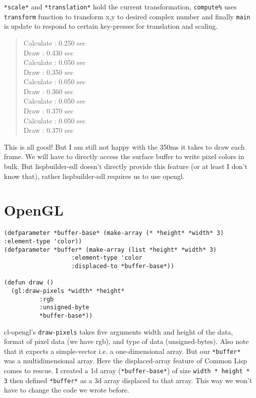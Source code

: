 \documentclass[11pt,a4paper]{article}
\begin{document}
\texttt{*scale*} and \texttt{*translation*} hold the current transformation, \texttt{compute\%} uses \texttt{transform} function to transform x,y to desired complex number and finally \texttt{main} is update to respond to certain key-presses for translation and scaling.

\begin{verse}
Calculate : 0.250 sec\\
Draw      : 0.430 sec\\
Calculate : 0.050 sec\\
Draw      : 0.350 sec\\
Calculate : 0.050 sec\\
Draw      : 0.360 sec\\
Calculate : 0.050 sec\\
Draw      : 0.370 sec\\
Calculate : 0.050 sec\\
Draw      : 0.370 sec\\
\end{verse}

This is all good! But I am still not happy with the 350ms it takes to draw each frame. 
We will have to directly access the surface buffer to write pixel colors in bulk. But lispbuilder-sdl doesn't directly provide this feature (or at least I don't know that), rather lispbuilder-sdl requires us to use opengl. 

\section{OpenGL}
\label{sec:org4f1eb20}
\begin{lstlisting}
(defparameter *buffer-base* (make-array (* *height* *width* 3) :element-type 'color))
(defparameter *buffer* (make-array (list *height* *width* 3)
				   :element-type 'color
				   :displaced-to *buffer-base*))

(defun draw ()
  (gl:draw-pixels *width* *height*
		  :rgb
		  :unsigned-byte
		  *buffer-base*))
\end{lstlisting}

cl-opengl's \texttt{draw-pixels} takes five arguments width and height of the data, format of pixel data (we have rgb), and type of data (unsigned-bytes). Also note that it expects a simple-vector i.e. a one-dimensional array. But our \texttt{*buffer*} was a multidimensional array. Here the displaced-array feature of Common Lisp comes to rescue. I created a 1d array (\texttt{*buffer-base*}) of size \texttt{width * height * 3} then defined \texttt{*buffer*} as a 3d array displaced to that array. This way we won't have to change the code we wrote before. 
\end{document}
